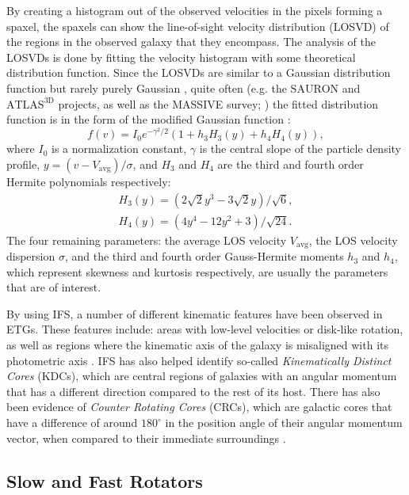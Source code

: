 \documentclass[english, twoside]{HYgradu}
\begin{document}
By creating a histogram out of the observed velocities in the pixels forming a spaxel, the spaxels can show the line-of-sight velocity distribution (LOSVD) of the regions in the observed galaxy that they encompass. The analysis of the LOSVDs is done by fitting the velocity histogram with some theoretical distribution function. Since the LOSVDs are similar to a Gaussian distribution function but rarely purely Gaussian \citep{GalaxyFormationAndEvo2010}, quite often  (e.g. the $\mathrm{SAURON}$ and $\mathrm{ATLAS^{3D}}$ projects, as well as the MASSIVE survey; \citealt{Bacon2001, Cappellari2011, Ma2014MASSIVE}) the fitted distribution function is in the form of the modified Gaussian function \citep{VanDerMarel1993, Bender1994}:
\begin{equation}
f(v) = I_0 e^{-\gamma^2/2}(1 + h_3 H_3(y) + h_4 H_4(y)), \label{eq:mod_gaussian}
\end{equation} 
where $I_0$ is a normalization constant, $\gamma$ is the central slope of the particle density profile, $y = (v - V_\mathrm{avg})/\sigma$, and $H_3$ and $H_4$ are the third and fourth order Hermite polynomials respectively:
\begin{eqnarray}
H_3(y) = \left(2\sqrt{2}y^3 - 3\sqrt{2}y\right) / \sqrt{6}, \\
H_4(y) = \left(4y^4 - 12y^2 + 3 \right) / \sqrt{24}.
\end{eqnarray}
The four remaining parameters: the average LOS velocity $V_\mathrm{avg}$, the LOS velocity dispersion $\sigma$, and the third and fourth order Gauss-Hermite moments $h_3$ and $h_4$, which represent skewness and kurtosis respectively, are usually the parameters that are of interest.

By using IFS, a number of different kinematic features have been observed in ETGs. These features include: areas with low-level velocities or disk-like rotation, as well as regions where the kinematic axis of the galaxy is misaligned with its photometric axis \citep{Emsellem2007}. IFS has also helped identify so-called \textit{Kinematically Distinct Cores} (KDCs), which are central regions of galaxies with an angular momentum that has a different direction compared to the rest of its host. There has also been evidence of \textit{Counter Rotating Cores} (CRCs), which are galactic cores that have a difference of around $180^\circ$ in the position angle of their angular momentum vector, when compared to their immediate surroundings \citep{Krajnovic2011}.

\subsection{Slow and Fast Rotators} \label{section:slow_fast_rotators}
\end{document}
